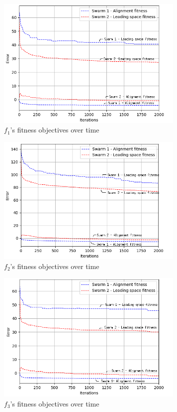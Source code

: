 \documentclass[conference]{IEEEtran}
\begin{document}
\begin{figure}[htbp]
\centerline{\includegraphics[width=90mm]{images/results/f1-fitness.png}}
\caption{$f_1$'s fitness objectives over time }
\label{fig:f1:fitness}
\end{figure}

\begin{figure}[htbp]
\centerline{\includegraphics[width=90mm]{images/results/f2-fitness.png}}
\caption{$f_2$'s fitness objectives over time }
\label{fig:f2:fitness}
\end{figure}

\begin{figure}[htbp]
\centerline{\includegraphics[width=90mm]{images/results/f3-fitness.png}}
\caption{$f_3$'s fitness objectives over time }
\label{fig:f3:fitness}
\end{figure}
\end{document}
